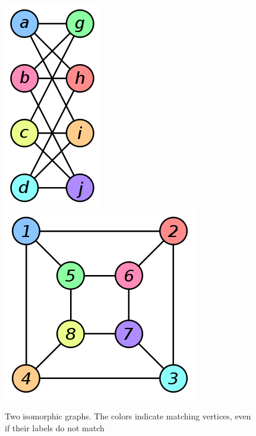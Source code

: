 \documentclass[letterpaper, 12pt]{article}
\begin{document}
    \begin{figure}[h]
        \label{graph-iso-image-figure}
        \caption{Two isomorphic graphs. The colors indicate matching vertices, even
        if their labels do not match~\cite{wikimedia-images}}
        \centering
        \includegraphics[scale=0.3]{graph-iso-a}
        \includegraphics[scale=0.3]{graph-iso-b}
    \end{figure}
\end{document}
